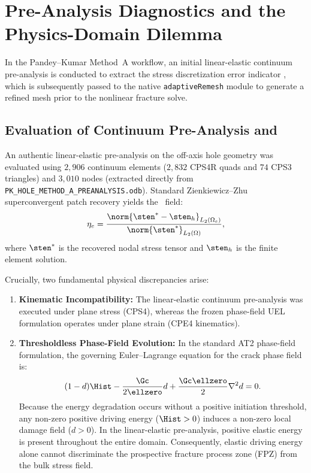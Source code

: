 \section{Pre-Analysis Diagnostics and the Physics-Domain Dilemma}
\label{sec:hole_preanalysis}

In the Pandey--Kumar Method~A workflow, an initial linear-elastic continuum pre-analysis is conducted to extract the stress discretization error indicator \MISESERI, which is subsequently passed to the native \Abaqus \texttt{adaptiveRemesh} module to generate a refined mesh prior to the nonlinear fracture solve.

\subsection{Evaluation of Continuum Pre-Analysis and \MISESERI}
\label{subsec:hole_miseseri_eval}

An authentic linear-elastic pre-analysis on the off-axis hole geometry was evaluated using $2{,}906$ continuum elements ($2{,}832$ CPS4R quads and $74$ CPS3 triangles) and $3{,}010$ nodes (extracted directly from \texttt{PK\_HOLE\_METHOD\_A\_PREANALYSIS.odb}). Standard Zienkiewicz--Zhu superconvergent patch recovery \citep{zienkiewicz1987} yields the \MISESERI\ field:
\begin{equation}
  \eta_e = \frac{\norm{\sten^* - \sten_h}_{L_2(\Omega_e)}}{\norm{\sten^*}_{L_2(\Omega)}},
  \label{eq:miseseri_formula}
\end{equation}
where $\sten^*$ is the recovered nodal stress tensor and $\sten_h$ is the finite element solution.

Crucially, two fundamental physical discrepancies arise:
\begin{enumerate}
  \item \textbf{Kinematic Incompatibility:} The linear-elastic continuum pre-analysis was executed under plane stress (CPS4), whereas the frozen phase-field UEL formulation operates under plane strain (CPE4 kinematics).
  \item \textbf{Thresholdless Phase-Field Evolution:} In the standard AT2 phase-field formulation, the governing Euler--Lagrange equation for the crack phase field is:
  \begin{equation}
    (1-d)\Hist - \frac{\Gc}{2 \ellzero} d + \frac{\Gc \ellzero}{2} \nabla^2 d = 0.
    \label{eq:at2_euler_lagrange}
  \end{equation}
  Because the energy degradation occurs without a positive initiation threshold, any non-zero positive driving energy ($\Hist > 0$) induces a non-zero local damage field ($d > 0$). In the linear-elastic pre-analysis, positive elastic energy is present throughout the entire domain. Consequently, elastic driving energy alone cannot discriminate the prospective fracture process zone (FPZ) from the bulk stress field.
\end{enumerate}

